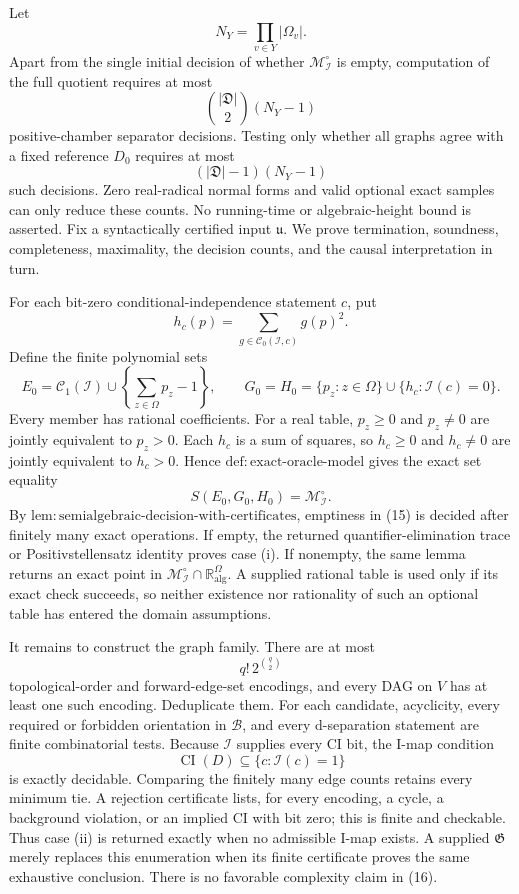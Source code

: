 Let
\[
 N_Y=\prod_{v\in Y}|\Omega_v|.
\]
Apart from the single initial decision of whether \(\mathcal M_{\mathcal I}^{\circ}\) is empty, computation of the full quotient requires at most
\[
 \binom{|\mathfrak D|}{2}(N_Y-1) \tag{12}
\]
positive-chamber separator decisions.  Testing only whether all graphs agree with a fixed reference \(D_0\) requires at most
\[
 (|\mathfrak D|-1)(N_Y-1) \tag{13}
\]
such decisions.  Zero real-radical normal forms and valid optional exact samples can only reduce these counts.  No running-time or algebraic-height bound is asserted.
Fix a syntactically certified input \(\mathfrak u\).  We prove termination, soundness, completeness, maximality, the decision counts, and the causal interpretation in turn.

For each bit-zero conditional-independence statement \(c\), put
\[
 h_c(p)=\sum_{g\in\mathcal C_0(\mathcal I,c)}g(p)^2.
\]
Define the finite polynomial sets
\[
 E_0=\mathcal C_1(\mathcal I)\cup
 \left\{\sum_{z\in\Omega}p_z-1\right\},
 \qquad
 G_0=H_0=\{p_z:z\in\Omega\}\cup\{h_c:\mathcal I(c)=0\}. \tag{14}
\]
Every member has rational coefficients.  For a real table, \(p_z\geq0\) and \(p_z\neq0\) are jointly equivalent to \(p_z>0\).  Each \(h_c\) is a sum of squares, so \(h_c\geq0\) and \(h_c\neq0\) are jointly equivalent to \(h_c>0\).  Hence \(\mathrm{def{:}exact\text{-}oracle\text{-}model}\) gives the exact set equality
\[
 S(E_0,G_0,H_0)=\mathcal M_{\mathcal I}^{\circ}. \tag{15}
\]
By \(\mathrm{lem{:}semialgebraic\text{-}decision\text{-}with\text{-}certificates}\), emptiness in (15) is decided after finitely many exact operations.  If empty, the returned quantifier-elimination trace or Positivstellensatz identity proves case (i).  If nonempty, the same lemma returns an exact point in \(\mathcal M_{\mathcal I}^{\circ}\cap\mathbb R_{\mathrm{alg}}^\Omega\).  A supplied rational table is used only if its exact check succeeds, so neither existence nor rationality of such an optional table has entered the domain assumptions.

It remains to construct the graph family.  There are at most
\[
 q!\,2^{\binom q2} \tag{16}
\]
topological-order and forward-edge-set encodings, and every DAG on \(V\) has at least one such encoding.  Deduplicate them.  For each candidate, acyclicity, every required or forbidden orientation in \(\mathcal B\), and every d-separation statement are finite combinatorial tests.  Because \(\mathcal I\) supplies every CI bit, the I-map condition
\[
 \operatorname{CI}(D)\subseteq\{c:\mathcal I(c)=1\} \tag{17}
\]
is exactly decidable.  Comparing the finitely many edge counts retains every minimum tie.  A rejection certificate lists, for every encoding, a cycle, a background violation, or an implied CI with bit zero; this is finite and checkable.  Thus case (ii) is returned exactly when no admissible I-map exists.  A supplied \(\mathfrak G\) merely replaces this enumeration when its finite certificate proves the same exhaustive conclusion.  There is no favorable complexity claim in (16).

